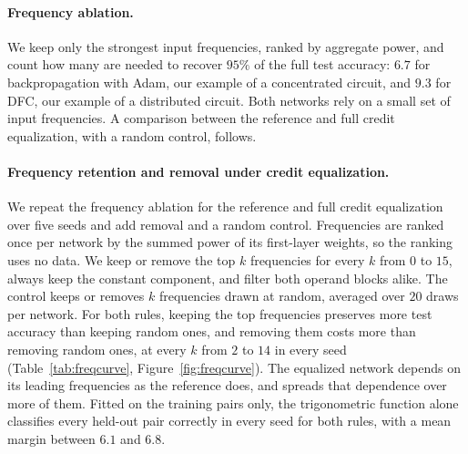 \documentclass{article} %
\begin{document}
\paragraph{Frequency ablation.} We keep only the strongest input frequencies, ranked by aggregate power, and count how many are needed to recover $95\%$ of the full test accuracy: $6.7$ for backpropagation with Adam, our example of a concentrated circuit, and $9.3$ for DFC, our example of a distributed circuit. Both networks rely on a small set of input frequencies. A comparison between the reference and full credit equalization, with a random control, follows.

\paragraph{Frequency retention and removal under credit equalization.} We repeat the frequency ablation for the reference and full credit equalization over five seeds and add removal and a random control. Frequencies are ranked once per network by the summed power of its first-layer weights, so the ranking uses no data. We keep or remove the top $k$ frequencies for every $k$ from $0$ to $15$, always keep the constant component, and filter both operand blocks alike. The control keeps or removes $k$ frequencies drawn at random, averaged over $20$ draws per network. For both rules, keeping the top frequencies preserves more test accuracy than keeping random ones, and removing them costs more than removing random ones, at every $k$ from $2$ to $14$ in every seed (Table~\ref{tab:freqcurve}, Figure~\ref{fig:freqcurve}). The equalized network depends on its leading frequencies as the reference does, and spreads that dependence over more of them. Fitted on the training pairs only, the trigonometric function alone classifies every held-out pair correctly in every seed for both rules, with a mean margin between $6.1$ and $6.8$.
\end{document}
